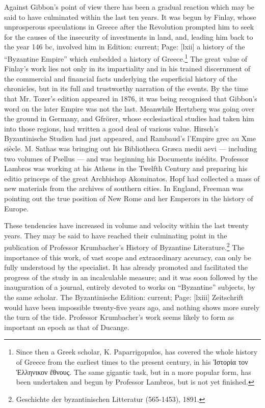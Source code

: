 Against Gibbon\texthebrew{}’s point of view there has been a gradual reaction which may be said to have culminated within the last ten years. It was begun by Finlay, whose unprosperous speculations in Greece after the Revolution prompted him to seek for the causes of the insecurity of investments in land, and, leading him back to the year 146 bc, involved him in Edition: current; Page: [lxii] a history of the \texthebrew{“}Byzantine Empire\texthebrew{}” which embedded a history of Greece.\footnote{Since then a Greek scholar, K. Paparrigopulos, has covered the whole history of Greece from the earliest times to the present century, in his \textgreek{\texthebrew{Ἰ}στορία τον \texthebrew{Ἑ}λληνικον \texthebrew{ἔ}θνους}. The same gigantic task, but in a more popular form, has been undertaken and begun by Professor Lambros, but is not yet finished.} The great value of Finlay\texthebrew{}’s work lies not only in its impartiality and in his trained discernment of the commercial and financial facts underlying the superficial history of the chronicles, but in its full and trustworthy narration of the events. By the time that Mr. Tozer\texthebrew{}’s edition appeared in 1876, it was being recognised that Gibbon\texthebrew{}’s word on the later Empire was not the last. Meanwhile Hertzberg was going over the ground in Germany, and Gfrörer, whose ecclesiastical studies had taken him into those regions, had written a good deal of various value. Hirsch\texthebrew{}’s Byzantinische Studien had just appeared, and Rambaud\texthebrew{}’s l\texthebrew{}’Empire grec au Xme siècle. M. Sathas was bringing out his Bibliotheca Græca medii aevi \texthebrew{—} including two volumes of Psellus \texthebrew{—} and was beginning his Documents inédits. Professor Lambros was working at his Athens in the Twelfth Century and preparing his editio princeps of the great Archbishop Akominatos. Hopf had collected a mass of new materials from the archives of southern cities. In England, Freeman was pointing out the true position of New Rome and her Emperors in the history of Europe.

These tendencies have increased in volume and velocity within the last twenty years. They may be said to have reached their culminating point in the publication of Professor Krumbacher\texthebrew{}’s History of Byzantine Literature.\footnote{Geschichte der byzantinischen Litteratur (565-1453), 1891.} The importance of this work, of vast scope and extraordinary accuracy, can only be fully understood by the specialist. It has already promoted and facilitated the progress of the study in an incalculable measure; and it was soon followed by the inauguration of a journal, entirely devoted to works on \texthebrew{“}Byzantine\texthebrew{}” subjects, by the same scholar. The Byzantinische Edition: current; Page: [lxiii] Zeitschrift would have been impossible twenty-five years ago, and nothing shows more surely the turn of the tide. Professor Krumbacher\texthebrew{}’s work seems likely to form as important an epoch as that of Ducange.

